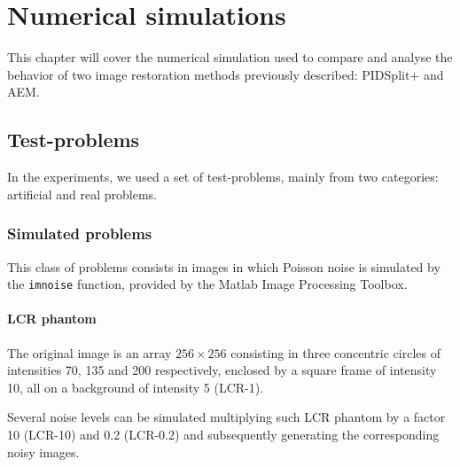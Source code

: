 \chapter{Numerical simulations}

This chapter will cover the numerical simulation used to compare and analyse the behavior of two image restoration methods previously described: PIDSplit+ and AEM.

\section{Test-problems}

In the experiments, we used a set of test-problems, mainly from two categories: artificial and real problems.

\subsection{Simulated problems}

This class of problems consists in images in which Poisson noise is simulated by the \verb|imnoise| function, provided by the Matlab Image Processing Toolbox.

\subsubsection{LCR phantom}

The original image is an array  $256 \times 256$ consisting in three concentric circles of intensities 70, 135 and 200 respectively, enclosed by a square frame of intensity 10, all on a background of intensity 5 (LCR-1).

Several noise levels can be simulated multiplying such LCR phantom by a factor 10 (LCR-10) and 0.2 (LCR-0.2) and subsequently generating the corresponding noisy images.

